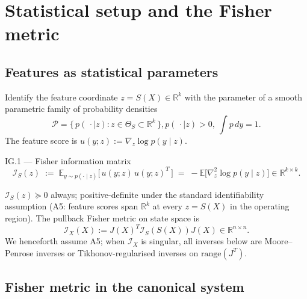 \documentclass[11pt,oneside]{amsart}
\def\qquad{ }%
\def\textbf#1{#1}%
\theoremstyle{plain}
\theoremstyle{definition}
\newcommand{\R}{\mathbb{R}}
\begin{document}
\section{Statistical setup and the Fisher metric}
\label{sec:fisher-setup}

\subsection{Features as statistical parameters}

Identify the feature coordinate $z=S(X)\in\R^{k}$ with the parameter
of a smooth parametric family of probability densities
\[
  \mathcal{P} = \bigl\{\,p(\,\cdot\mid z) : z\in\Theta_{S}\subset\R^{k}\,\bigr\},
  \qquad p(\,\cdot\mid z)>0,\ \int p\,dy = 1.
\]
The feature score is $u(y;z) := \nabla_{z}\log p(y\mid z)$.

\begin{defbox}{IG.1 --- Fisher information matrix}
\[
  \mathcal{I}_{S}(z) \;:=\; \mathbb{E}_{y\sim p(\cdot\mid z)}
        \bigl[\,u(y;z)\,u(y;z)^{T}\,\bigr]
  \;=\; -\mathbb{E}\bigl[\nabla^{2}_{z}\log p(y\mid z)\bigr]
  \in\R^{k\times k}.
\]
\end{defbox}

$\mathcal{I}_{S}(z)\succeq 0$ always; positive-definite under the standard
identifiability assumption (\textbf{A5}: feature scores span $\R^{k}$ at
every $z=S(X)$ in the operating region). The pullback Fisher metric on
state space is
\[
  \mathcal{I}_{X}(X) := J(X)^{T}\mathcal{I}_{S}(S(X))J(X)\in\R^{n\times n}.
\]
We henceforth assume \textbf{A5}; when $\mathcal{I}_{X}$ is singular,
all inverses below are Moore--Penrose inverses or Tikhonov-regularised
inverses on $\mathrm{range}(J^{T})$.

\subsection{Fisher metric in the canonical system}
\end{document}
